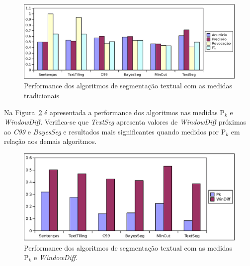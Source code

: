 
  \begin{figure}[!h]
	  \centering
	  \includegraphics[width=1\textwidth]{conteudo/capitulos/figs/grafico-medidas-APRF1.eps}
	  \caption{Performance dos algoritmos de segmentação textual com as medidas tradicionais}
	  \label{fig:grafico-medidas-tradicionais}
  \end{figure}
  

Na Figura~\ref{fig:grafico-medidas-Pk-Wd} é apresentada a performance dos algoritmos nas medidas P$_k$ e \textit{WindowDiff}. Verifica-se que \textit{TextSeg} apresenta valores de \textit{WindowDiff} próximas ao \textit{C99} e \textit{BayesSeg} e resultados mais significantes quando medidos por P$_k$ em relação aos demais algoritmos.



  \begin{figure}[!h]
	  \centering
	  \includegraphics[width=1\textwidth]{conteudo/capitulos/figs/grafico-medidas-Pk-Wd.eps}
	  \caption{Performance dos algoritmos de segmentação textual com as medidas P$_k$ e \textit{WindowDiff}.}
	  \label{fig:grafico-medidas-Pk-Wd}
  \end{figure}











